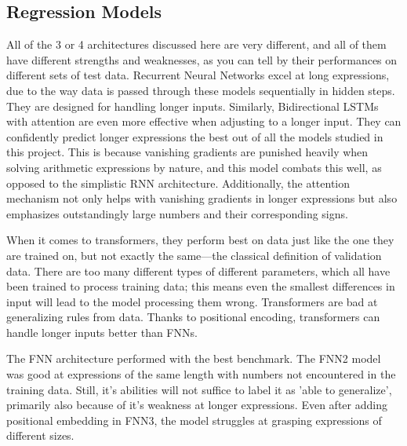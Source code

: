\documentclass{article}
\begin{document}
\subsection{Regression Models}
All of the 3 or 4 architectures discussed here are very different, and all of them have different strengths and weaknesses, as you can tell by their performances on different sets of test data. Recurrent Neural Networks excel at long expressions, due to the way data is passed through these models sequentially in hidden steps. They are designed for handling longer inputs. Similarly, Bidirectional LSTMs with attention are even more effective when adjusting to a longer input. They can confidently predict longer expressions the best out of all the models studied in this project. This is because vanishing gradients are punished heavily when solving arithmetic expressions by nature, and this model combats this well, as opposed to the simplistic RNN architecture. Additionally, the attention mechanism not only helps with vanishing gradients in longer expressions but also emphasizes outstandingly large numbers and their corresponding signs. 

When it comes to transformers, they perform best on data just like the one they are trained on, but not exactly the same—the classical definition of validation data. There are too many different types of different parameters, which all have been trained to process training data; this means even the smallest differences in input will lead to the model processing them wrong. Transformers are bad at generalizing rules from data. Thanks to positional encoding, transformers can handle longer inputs better than FNNs.

The FNN architecture performed with the best benchmark. The FNN2 model was good at expressions of the same length with numbers not encountered in the training data. Still, it's abilities will not suffice to label it as 'able to generalize', primarily also because of it's weakness at longer expressions. Even after adding positional embedding in FNN3, the model struggles at grasping expressions of different sizes.
\end{document}
